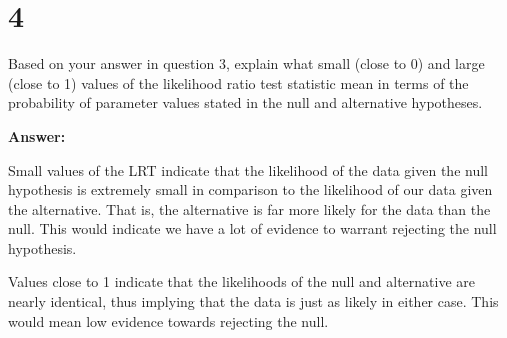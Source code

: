 \section{4}

Based on your answer in question 3, explain what small (close to 0) and large (close to 1) values of the likelihood ratio test statistic mean in terms of the probability of parameter values stated in the null and alternative hypotheses. 

\noindent\textbf{Answer:}

Small values of the LRT indicate that the likelihood of the data given the null hypothesis is extremely small in comparison to the likelihood of our data given the alternative. That is, the alternative is far more likely for the data than the null. This would indicate we have a lot of evidence to warrant rejecting the null hypothesis.

Values close to 1 indicate that the likelihoods of the null and alternative are nearly identical, thus implying that the data is just as likely in either case. This would mean low evidence towards rejecting the null. 
